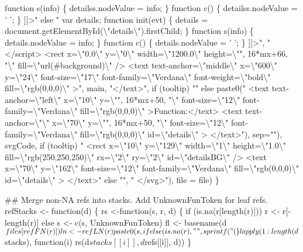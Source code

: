 \documentclass[11pt]{article}
\begin{document}
\begin{nwchunk}
     function s(info) \{ detailss.nodeValue = info; \}
         function c() \{ detailss.nodeValue = ' '; \}
     ]]>" else "
     var details;
     function init(evt) \{ details = document.getElementById({\textbackslash}"details{\textbackslash}").firstChild; \}
     function s(info) \{ details.nodeValue = info; \}
     function c() \{ details.nodeValue = ' '; \}
     ]]>", "
     </script>
     <rect x={\textbackslash}"0.0{\textbackslash}" y={\textbackslash}"0{\textbackslash}" width={\textbackslash}"1200.0{\textbackslash}" height={\textbackslash}"", 16*mx+66, "{\textbackslash}" fill={\textbackslash}"url(#background){\textbackslash}"  />
     <text text-anchor={\textbackslash}"middle{\textbackslash}" x={\textbackslash}"600{\textbackslash}" y={\textbackslash}"24{\textbackslash}" font-size={\textbackslash}"17{\textbackslash}" font-family={\textbackslash}"Verdana{\textbackslash}" font-weight={\textbackslash}"bold{\textbackslash}" fill={\textbackslash}"rgb(0,0,0){\textbackslash}"  >", main, "</text>", if (tooltip) "" else paste0("
     <text text-anchor={\textbackslash}"left{\textbackslash}" x={\textbackslash}"10{\textbackslash}" y={\textbackslash}"", 16*mx+50, "{\textbackslash}" font-size={\textbackslash}"12{\textbackslash}" font-family={\textbackslash}"Verdana{\textbackslash}" fill={\textbackslash}"rgb(0,0,0){\textbackslash}"  >Function:</text>
     <text text-anchor={\textbackslash}"{\textbackslash}" x={\textbackslash}"70{\textbackslash}" y={\textbackslash}"", 16*mx+50, "{\textbackslash}" font-size={\textbackslash}"12{\textbackslash}" font-family={\textbackslash}"Verdana{\textbackslash}" fill={\textbackslash}"rgb(0,0,0){\textbackslash}" id={\textbackslash}"details{\textbackslash}" > </text>"), sep=""), svgCode, if (tooltip) "
     <rect x={\textbackslash}"10{\textbackslash}" y={\textbackslash}"129{\textbackslash}" width={\textbackslash}"1{\textbackslash}" height={\textbackslash}"1.0{\textbackslash}" fill={\textbackslash}"rgb(250,250,250){\textbackslash}" rx={\textbackslash}"2{\textbackslash}" ry={\textbackslash}"2{\textbackslash}" id={\textbackslash}"detailsBG{\textbackslash}" />
     <text x={\textbackslash}"70{\textbackslash}" y={\textbackslash}"162{\textbackslash}" font-size={\textbackslash}"12{\textbackslash}" font-family={\textbackslash}"Verdana{\textbackslash}" fill={\textbackslash}"rgb(0,0,0){\textbackslash}" id={\textbackslash}"details{\textbackslash}" > </text>" else "", "
     </svg>"), file = file)
 \}
 
 ## Merge non-NA refs into stacks. Add UnknownFunToken for leaf refs.
 refStacks <- function(d) \{
     rs <-function(s, r, d) \{
         if (is.na(r[length(r)]))
             r <- r[-length(r)]
         else
             s <- c(s, UnknownFunToken)
         fl <- basename(d$files[refFN(r)])
         ln <- refLN(r)
         paste0(s, ifelse(is.na(r), "", sprintf(" (%
     \}
     lapply(1:length(d$stacks), function(i) rs(d$stacks[[i]], d$refs[[i]], d))
 \}
 

\end{nwchunk}
\end{document}
